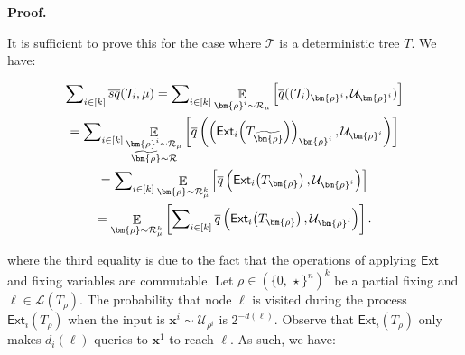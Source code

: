 \documentclass[10pt,a4paper]{article}
\begin{document}




\par\medskip\noindent\textbf{Proof.}\par




It is sufficient to prove this for the case where $\mathcal{T}$ is a deterministic tree $T$. We have:\par


\[\begin{gathered}
\displaystyle\sum\nolimits_{i\in[k]}\mathop{\overline{sq}}(\mathcal{T}_{i},\mu)= \displaystyle\sum\nolimits_{i\in[k]}\mathop{\mathbb{E}}_{\bm{\rho}^{i}\sim\mathcal{R}_{\mu}}\left[\overline{q}((\mathcal{T}_{i})_{\bm{\rho}^{i}},\mathcal{U}_{\bm{\rho}^{i}})\right] \\
\displaystyle= \displaystyle\sum\nolimits_{i\in[k]}\mathop{\mathbb{E}}_{\begin{subarray}{c}\bm{\rho}^{i}\sim\mathcal{R}_{\mu}\\
\widetilde{\bm{\rho}}\sim\mathcal{R}\end{subarray}}\left[\overline{q}\left(\left(\mathsf{Ext}_{i}\mathopen{}\left(T_{\widetilde{\bm{\rho}}}\mathclose{}\right)\right)_{\bm{\rho}^{i}},\mathcal{U}_{\bm{\rho}^{i}}\right)\right] \\
\displaystyle= \displaystyle\sum\nolimits_{i\in[k]}\mathop{\mathbb{E}}_{\bm{\rho}\sim\mathcal{R}_{\mu}^{k}}\left[\overline{q}\left(\mathsf{Ext}_{i}\mathopen{}\left(T_{\bm{\rho}}\mathclose{}\right),\mathcal{U}_{\bm{\rho}^{i}}\right)\right] \\
\displaystyle= \displaystyle\mathop{\mathbb{E}}_{\bm{\rho}\sim\mathcal{R}_{\mu}^{k}}\left[\sum\nolimits_{i\in[k]}\overline{q}\left(\mathsf{Ext}_{i}\mathopen{}\left(T_{\bm{\rho}}\mathclose{}\right),\mathcal{U}_{\bm{\rho}^{i}}\right)\right].
\end{gathered}\]


where the third equality is due to the fact that the operations of applying $\mathsf{Ext}$ and fixing variables are commutable. Let $\rho\in(\{0,\,\star\}^{n})^{k}$ be a partial fixing and $\ell\in\mathcal{L}(T_{\rho})$. The probability that node $\ell$ is visited during the process $\mathsf{Ext}_{i}\mathopen{}\left(T_{\rho}\mathclose{}\right)$ when the input is $\bm{x}^{i}\sim\mathcal{U}_{\rho^{i}}$ is $2^{-d(\ell)}$. Observe that $\mathsf{Ext}_{i}\mathopen{}\left(T_{\rho}\mathclose{}\right)$ only makes $d_{i}(\ell)$ queries to $\bm{x}^{1}$ to reach $\ell$. As such, we have:\par
\end{document}
